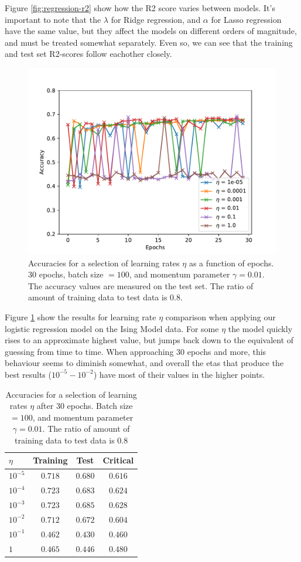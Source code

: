 Figure \ref{fig:regression-r2} show how the R2 score varies between models. It's important
to note that the $\lambda$ for Ridge regression, and $\alpha$ for Lasso regression have
the same value, but they affect the models on different orders of magnitude, and must be
treated somewhat separately. Even so, we can see that the training and test set R2-scores
follow eachother closely.
\begin{figure}[h]
\includegraphics[width = 0.8\paperwidth]{figures/logistic_eta.pdf}
    \caption{Accuracies for a selection of learning rates $\eta$ as a function of epochs. 
    30 epochs, batch size $= 100$, and momentum parameter $\gamma = 0.01$. The accuracy
    values are measured on the test set.
    The ratio of amount of training data to test data is $0.8$.}
\label{fig:logistic-eta}
\end{figure}
Figure \ref{fig:logistic-eta} show the results for learning rate $\eta$ comparison when applying
our logistic regression model on the Ising Model data. For some $\eta$ the model quickly rises
to an approximate highest value, but jumps back down to the equivalent of guessing from time
to time. When approaching 30 epochs and more, this behaviour seems to diminish somewhat, and
overall the etas that produce the best results ($10^{-5} - 10^{-2}$) have most of their values
in the higher points.
\begin{table}[h]
\center
\begin{tabular}{l|c|c|c}
$\eta$ & Training & Test & Critical  \\
\hline
$10^{-5}$ & $0.718$ & $0.680$ & $0.616$ \\
$10^{-4}$ & $0.723$ & $0.683$ & $0.624$ \\
$10^{-3}$ & $0.723$ & $0.685$ & $0.628$ \\
$10^{-2}$ & $0.712$ & $0.672$ & $0.604$ \\
$10^{-1}$ & $0.462$ & $0.430$ & $0.460$ \\
$1$    & $0.465$ & $0.446$ & $0.480$
\end{tabular}
    \caption{Accuracies for a selection of learning rates $\eta$ after 
    30 epochs. Batch size $= 100$, and momentum parameter $\gamma = 0.01$.
    The ratio of amount of training data to test data is $0.8$}
    \label{tab:logistic-critical}
\end{table}
